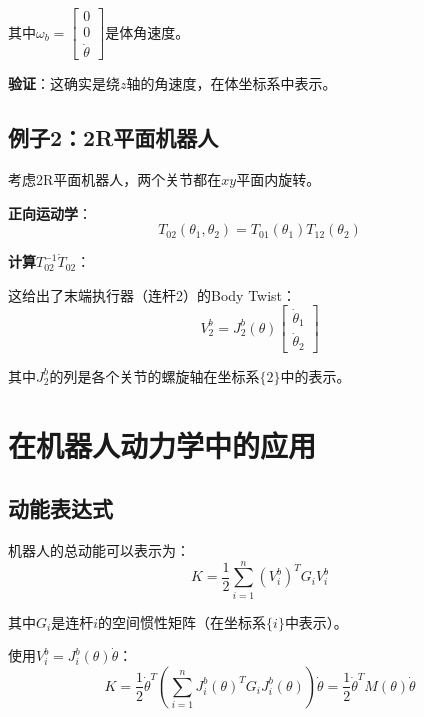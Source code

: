 \documentclass[12pt,a4paper]{article}
\begin{document}
其中$\omega_b = \begin{bmatrix} 0 \\ 0 \\ \dot{\theta} \end{bmatrix}$是体角速度。

\textbf{验证}：这确实是绕$z$轴的角速度，在体坐标系中表示。

\subsection{例子2：2R平面机器人}

考虑2R平面机器人，两个关节都在$xy$平面内旋转。

\textbf{正向运动学}：
\begin{equation}
T_{02}(\theta_1, \theta_2) = T_{01}(\theta_1) T_{12}(\theta_2)
\end{equation}

\textbf{计算$T_{02}^{-1}\dot{T}_{02}$}：

这给出了末端执行器（连杆2）的Body Twist：
\begin{equation}
V_2^b = J_2^b(\theta) \begin{bmatrix} \dot{\theta}_1 \\ \dot{\theta}_2 \end{bmatrix}
\end{equation}

其中$J_2^b$的列是各个关节的螺旋轴在坐标系$\{2\}$中的表示。

\section{在机器人动力学中的应用}

\subsection{动能表达式}

机器人的总动能可以表示为：
\begin{equation}
K = \frac{1}{2}\sum_{i=1}^{n} (V_i^b)^T G_i V_i^b
\end{equation}

其中$G_i$是连杆$i$的空间惯性矩阵（在坐标系$\{i\}$中表示）。

使用$V_i^b = J_i^b(\theta) \dot{\theta}$：
\begin{equation}
K = \frac{1}{2}\dot{\theta}^T \left(\sum_{i=1}^{n} J_i^b(\theta)^T G_i J_i^b(\theta)\right) \dot{\theta} = \frac{1}{2}\dot{\theta}^T M(\theta) \dot{\theta}
\end{equation}
\end{document}
